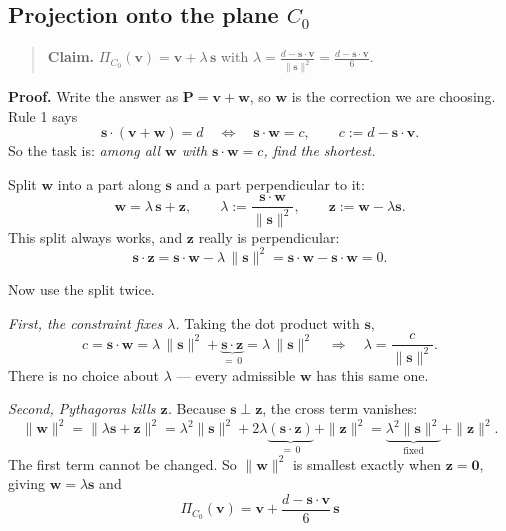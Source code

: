 \documentclass[11pt]{article}
\begin{document}
\subsection*{Projection onto the plane $C_0$}

\begin{quote}
\textbf{Claim.} $\displaystyle \Pi_{C_0}(\mathbf{v}) = \mathbf{v} + \lambda\,\mathbf{s}$
with $\displaystyle \lambda = \frac{d-\mathbf{s}\cdot\mathbf{v}}{\|\mathbf{s}\|^2}
= \frac{d-\mathbf{s}\cdot\mathbf{v}}{6}$.
\end{quote}

\noindent\textbf{Proof.} Write the answer as $\mathbf{P}=\mathbf{v}+\mathbf{w}$, so
$\mathbf{w}$ is the correction we are choosing. Rule 1 says
\[
\mathbf{s}\cdot(\mathbf{v}+\mathbf{w}) = d
\quad\Longleftrightarrow\quad
\mathbf{s}\cdot\mathbf{w} = c, \qquad c := d-\mathbf{s}\cdot\mathbf{v}.
\]
So the task is: \emph{among all $\mathbf{w}$ with $\mathbf{s}\cdot\mathbf{w}=c$,
find the shortest.}

Split $\mathbf{w}$ into a part along $\mathbf{s}$ and a part perpendicular to it:
\[
\mathbf{w} = \lambda\,\mathbf{s} + \mathbf{z},
\qquad
\lambda := \frac{\mathbf{s}\cdot\mathbf{w}}{\|\mathbf{s}\|^{2}},
\qquad
\mathbf{z} := \mathbf{w}-\lambda\mathbf{s}.
\]
This split always works, and $\mathbf{z}$ really is perpendicular:
\[
\mathbf{s}\cdot\mathbf{z}
= \mathbf{s}\cdot\mathbf{w} - \lambda\,\|\mathbf{s}\|^{2}
= \mathbf{s}\cdot\mathbf{w} - \mathbf{s}\cdot\mathbf{w} = 0 .
\]

Now use the split twice.

\emph{First, the constraint fixes $\lambda$.} Taking the dot product with $\mathbf{s}$,
\[
c = \mathbf{s}\cdot\mathbf{w}
= \lambda\,\|\mathbf{s}\|^{2} + \underbrace{\mathbf{s}\cdot\mathbf{z}}_{=\,0}
= \lambda\,\|\mathbf{s}\|^{2}
\quad\Longrightarrow\quad
\lambda = \frac{c}{\|\mathbf{s}\|^{2}} .
\]
There is no choice about $\lambda$ --- every admissible $\mathbf{w}$ has this same one.

\emph{Second, Pythagoras kills $\mathbf{z}$.} Because $\mathbf{s}\perp\mathbf{z}$,
the cross term vanishes:
\[
\|\mathbf{w}\|^{2}
= \|\lambda\mathbf{s}+\mathbf{z}\|^{2}
= \lambda^{2}\|\mathbf{s}\|^{2} + 2\lambda\underbrace{(\mathbf{s}\cdot\mathbf{z})}_{=\,0} + \|\mathbf{z}\|^{2}
= \underbrace{\lambda^{2}\|\mathbf{s}\|^{2}}_{\text{fixed}} + \|\mathbf{z}\|^{2}.
\]
The first term cannot be changed. So $\|\mathbf{w}\|^2$ is smallest exactly when
$\mathbf{z}=\mathbf{0}$, giving $\mathbf{w}=\lambda\mathbf{s}$ and
\[
\boxed{\;\Pi_{C_0}(\mathbf{v}) = \mathbf{v} + \frac{d-\mathbf{s}\cdot\mathbf{v}}{6}\,\mathbf{s}\;}
\tag*{$\blacksquare$}
\]
\end{document}
